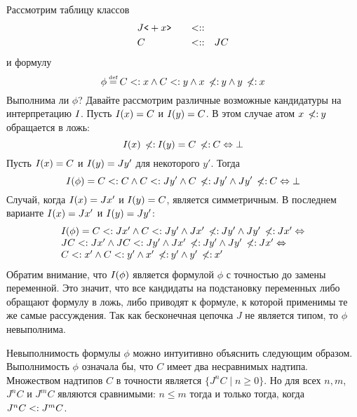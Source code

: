\begin{exmp}\label{exmp:unssatcycle}
Рассмотрим таблицу классов
\begin{alignat*}{3}
    &J\texttt{<}+{x}\texttt{>} \quad &<::& \quad  \\
    &C \quad &<::& \quad JC
\end{alignat*}
и формулу
\[
    \phi \eqdef C \subtype \xtype \land C \subtype \ytype \land \xtype \notsubtype \ytype \land \ytype \notsubtype \xtype
\]
Выполнима ли $\phi$? Давайте рассмотрим различные возможные кандидатуры на интерпретацию $I_{}$. Пусть $I_{}({x}) = C$ и $I_{}({y}) = C$. В этом случае атом ${x} \:\not\!\!{<:}\: {y}$ обращается в ложь:
\[
    I_{}({x}) \:\not\!\!{<:}\: I_{}({y}) =  C \:\not\!\!{<:}\: C \Leftrightarrow \bot
\]
Пусть $I_{}({x}) = C$ и $I_{}({y}) = J{y}'$ для некоторого $y'$.
Тогда
\[
    I(\phi) = C <: C \land C <: J{y}' \land C \:\not\!\!{<:}\: J{y}' \land J{y}' \:\not\!\!{<:}\: C \Leftrightarrow \bot
\]
Случай, когда $I_{}({x}) = J{{x}'}$ и $I_{}({y}) = C$, является симметричным. В последнем варианте $I({x}) = J{x}'$ и $I({y}) = J{y}'$:
\[
    \begin{array}{l}
    \interpretation{}{\phi} = C \subtype J\xtype' \land C \subtype J\ytype' \land J\xtype' \notsubtype J\ytype' \land J\ytype' \notsubtype J\xtype' \Leftrightarrow \\
    JC \subtype J\xtype' \land JC \subtype J\ytype' \land J\xtype' \notsubtype J\ytype' \land J\ytype' \notsubtype J\xtype' \Leftrightarrow \\
    C \subtype \xtype' \land C \subtype \ytype' \land \xtype' \notsubtype \ytype' \land \ytype' \notsubtype \xtype'
    \end{array}
\]
Обратим внимание, что $I_{}(\phi)$ является формулой $\phi$ с точностью до замены переменной. Это значит, что все кандидаты на подстановку переменных либо обращают формулу в ложь, либо приводят к формуле, к которой применимы те же самые рассуждения. Так как бесконечная цепочка $J$ не является типом, то $\phi$ невыполнима.

Невыполнимость формулы $\phi$ можно интуитивно объяснить следующим образом. Выполнимость $\phi$ означала бы, что $C$ имеет два несравнимых надтипа. Множеством надтипов $C$ в точности является $\{ J^{n}C \mid n\geq 0 \}$. Но для всех $n, m$, $J^{n}C$ и $J^{m}C$ являются сравнимыми: $n \leq m$ тогда и только тогда, когда $J^{n}C<:{}J^{m}C$.
\end{exmp}

